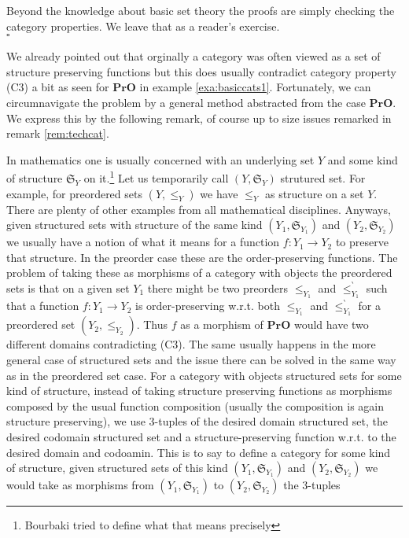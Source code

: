\begin{prf}
Beyond the knowledge about basic set theory the proofs are simply checking the category properties. We leave that as a reader's exercise.
\\
\phantom{proven}
\hfill
$\square$
\end{prf}
We already pointed out that orginally a category was often viewed as a set of structure preserving functions but this does usually contradict category property (C3) a bit as seen for $\mathbf{PrO}$ in example \ref{exa:basiccats1}. Fortunately, we can circumnavigate the problem by a general method abstracted from the case $\mathbf{PrO}$. We express this by the following remark, of course up to size issues remarked in remark \ref{rem:techcat}.
\\
\begin{rem}[(C3) Trick]
\label{rem:c3trick}
In mathematics one is usually concerned with an underlying set $Y$ and some kind of structure $\mathfrak{S}_{Y}$ on it.\footnote{Bourbaki tried to define what that means precisely} Let us temporarily call $(Y,\mathfrak{S}_{Y})$ strutured set. For example, for preordered sets $(Y,\leq_{Y})$ we have $\leq_{Y}$ as structure on a set $Y$. There are plenty of other examples from all mathematical disciplines. Anyways, given structured sets with structure of the same kind $(Y_{1},\mathfrak{S}_{Y_{1}})$ and $(Y_{2},\mathfrak{S}_{Y_{2}})$ we usually have a notion of what it means for a function $f \colon Y_{1} \rightarrow Y_{2}$ to preserve that structure. In the preorder case these are the order-preserving functions. The problem of taking these as morphisms of a category with objects the preordered sets  is that on a given set $Y_{1}$ there might be two preorders $\leq_{Y_{1}}$ and $\leq_{Y_{1}}^{\backprime}$ such that a function $f \colon Y_{1} \rightarrow Y_{2}$ is order-preserving w.r.t. both $\leq_{Y_{1}}$ and $\leq_{Y_{1}}^{\backprime}$ for a preordered set $(Y_{2},\leq_{Y_{2}})$. Thus $f$ as a morphism of $\mathbf{PrO}$ would have two different domains contradicting (C3). The same usually happens in the more general case of structured sets and the issue there can be solved in the same way as in the preordered set case. For a category with objects structured sets for some kind of structure, instead of taking structure preserving functions as morphisms composed by the usual function composition (usually the composition is again structure preserving), we use $3$-tuples of the desired domain structured set, the desired codomain structured set and a structure-preserving function w.r.t. to the desired domain and codoamin. This is to say to define a category for some kind of structure, given structured sets of this kind $(Y_{1},\mathfrak{S}_{Y_{1}})$ and $(Y_{2},\mathfrak{S}_{Y_{2}})$ we would take as morphisms from $(Y_{1},\mathfrak{S}_{Y_{1}})$ to $(Y_{2},\mathfrak{S}_{Y_{2}})$ the $3$-tuples

\end{rem}
